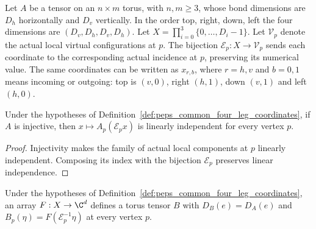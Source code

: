 \begin{definition}%
    \label{def:peps_common_four_leg_coordinates}
    \leanok
    Let $A$ be a tensor on an $n\times m$ torus, with $n,m\ge3$,
    whose bond dimensions are $D_h$ horizontally and $D_v$ vertically.
    In the order top, right, down, left the four dimensions are
    $(D_v,D_h,D_v,D_h)$. Let
    $X=\prod_{i=0}^3\{0,\ldots,D_i-1\}$.
    Let $\mathcal V_p$ denote the actual local virtual configurations at $p$.
    The bijection $\mathcal E_p:X\to\mathcal V_p$ sends each coordinate
    to the corresponding actual incidence at $p$, preserving its numerical
    value.
    The same coordinates can be written as $x_{r,b}$, where $r=h,v$ and
    $b=0,1$ means incoming or outgoing: top is $(v,0)$, right $(h,1)$,
    down $(v,1)$ and left $(h,0)$.
\end{definition}

\begin{lemma}%
    \label{thm:peps_four_leg_coordinate_independence}
    \leanok
    Under the hypotheses of Definition~\ref{def:peps_common_four_leg_coordinates},
    if $A$ is injective, then $x\mapsto A_p(\mathcal E_p x)$ is linearly
    independent for every vertex $p$.
\end{lemma}
\begin{proof}\leanok
    Injectivity makes the family of actual local components at $p$ linearly
    independent. Composing its index with the bijection $\mathcal E_p$
    preserves linear independence.
\end{proof}

\begin{definition}%
    \label{def:peps_repeated_four_leg_tensor}
    \leanok
    Under the hypotheses of Definition~\ref{def:peps_common_four_leg_coordinates},
    an array $F:X\to\C^d$ defines a torus tensor $B$ with
    $D_B(e)=D_A(e)$ and $B_p(\eta)=F(\mathcal E_p^{-1}\eta)$ at every
    vertex $p$.
\end{definition}

